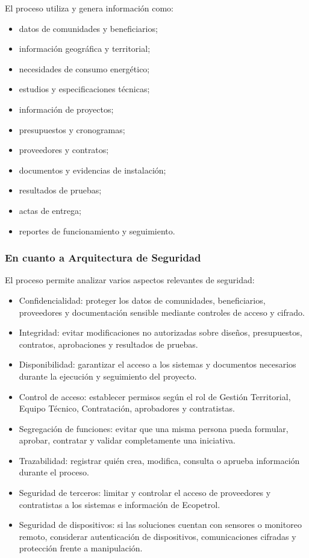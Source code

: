 El proceso utiliza y genera información como:

\begin{itemize}
    \item datos de comunidades y beneficiarios;
    \item información geográfica y territorial;
    \item necesidades de consumo energético;
    \item estudios y especificaciones técnicas;
    \item información de proyectos;
    \item presupuestos y cronogramas;
    \item proveedores y contratos;
    \item documentos y evidencias de instalación;
    \item resultados de pruebas;
    \item actas de entrega;
    \item reportes de funcionamiento y seguimiento.
\end{itemize}

\subsubsection*{En cuanto a Arquitectura de Seguridad}

El proceso permite analizar varios aspectos relevantes de seguridad:

\begin{itemize}
    \item Confidencialidad: proteger los datos de comunidades, beneficiarios, proveedores y documentación sensible mediante controles de acceso y cifrado.
    \item Integridad: evitar modificaciones no autorizadas sobre diseños, presupuestos, contratos, aprobaciones y resultados de pruebas.
    \item Disponibilidad: garantizar el acceso a los sistemas y documentos necesarios durante la ejecución y seguimiento del proyecto.
    \item Control de acceso: establecer permisos según el rol de Gestión Territorial, Equipo Técnico, Contratación, aprobadores y contratistas.
    \item Segregación de funciones: evitar que una misma persona pueda formular, aprobar, contratar y validar completamente una iniciativa.
    \item Trazabilidad: registrar quién crea, modifica, consulta o aprueba información durante el proceso.
    \item Seguridad de terceros: limitar y controlar el acceso de proveedores y contratistas a los sistemas e información de Ecopetrol.
    \item Seguridad de dispositivos: si las soluciones cuentan con sensores o monitoreo remoto, considerar autenticación de dispositivos, comunicaciones cifradas y protección frente a manipulación.
\end{itemize}
